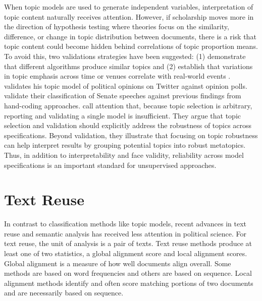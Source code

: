 \documentclass{article}
\begin{document}
When topic models are used to generate independent variables, interpretation of topic content naturally receives attention. However, if scholarship moves more in the direction of hypothesis testing where theories focus on the similarity, difference, or change in topic distribution between documents, there is a risk that topic content could become hidden behind correlations of topic proportion means. To avoid this, two validations strategies have been suggested: (1) demonstrate that different algorithms produce similar topics and (2) establish that variations in topic emphasis across time or venues correlate with real-world events \citep{Grimmer2011,Roberts2014,Blei2009,Quinn2010,Wilkerson2016}.  \citet{Beauchamp2017PredictingData} validates his topic model of political opinions on Twitter against opinion polls. 
\citet{Quinn2010} validate their classification of Senate speeches against previous findings from hand-coding approaches. \citet{Wilkerson2016} call attention that, because topic selection is arbitrary, reporting and validating a single model is insufficient. They argue that topic selection and validation should explicitly address the robustness of topics across specifications. Beyond validation, they illustrate that focusing on topic robustness can help interpret results by grouping potential topics into robust metatopics. Thus, in addition to interpretability and face validity, reliability across model specifications is an important standard for unsupervised approaches.

\section{Text Reuse}
In contrast to classification methods like topic models, recent advances in text reuse and semantic analysis has received less attention in political science. 
For text reuse, the unit of analysis is a pair of texts. Text reuse methods produce at least one of two statistics, a global alignment score and local alignment scores. Global alignment is a measure of how well documents align overall. Some methods are based on word frequencies and others are based on sequence. Local alignment methods identify and often score matching portions of two documents and are necessarily based on sequence.%
\end{document}
